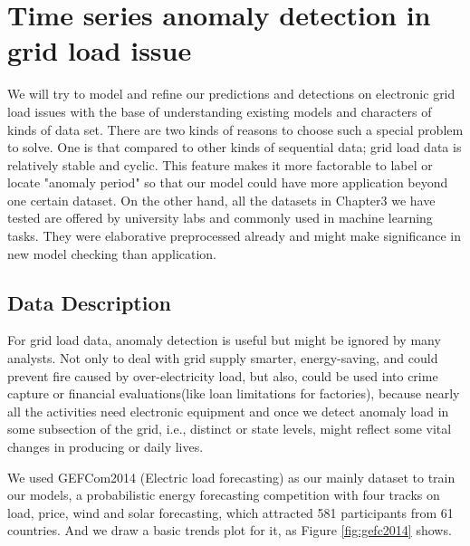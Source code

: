 
\chapter{Time series anomaly detection in grid load issue} %

\label{Chapter4} %
\setlength{\parindent}{0pt}

We will try to model and refine our predictions and detections on electronic grid load issues with the base of understanding existing models and characters of kinds of data set. There are two kinds of reasons to choose such a special problem to solve. One is that compared to other kinds of sequential data; grid load data is relatively stable and cyclic. This feature makes it more factorable to label or locate "anomaly period" so that our model could have more application beyond one certain dataset. On the other hand, all the datasets in Chapter3 we have tested are offered by university labs and commonly used in machine learning tasks. They were elaborative preprocessed already and might make significance in new model checking than application. 

\section{Data Description}
For grid load data, anomaly detection is useful but might be ignored by many analysts. Not only to deal with grid supply smarter, energy-saving, and could prevent fire caused by over-electricity load, but also, could be used into crime capture or financial evaluations(like loan limitations for factories), because nearly all the activities need electronic equipment and once we detect anomaly load in some subsection of the grid, i.e., distinct or state levels, might reflect some vital changes in producing or daily lives. 

We used GEFCom2014 (Electric load forecasting) as our mainly dataset to train our models, a probabilistic energy forecasting competition with four tracks on load, price, wind and solar forecasting, which attracted 581 participants from 61 countries. And we draw a basic trends plot for it, as Figure \ref{fig:gefc2014} shows.


